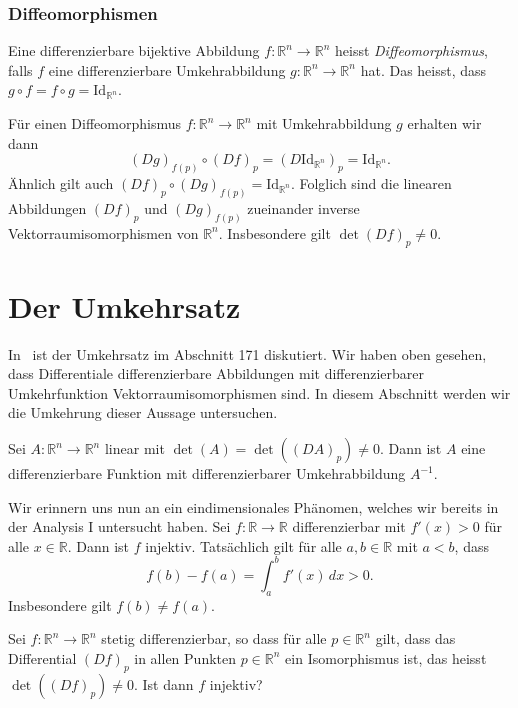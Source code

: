 \documentclass[../main.tex]{subfiles}
\begin{document}
\subsubsection*{Diffeomorphismen}
\begin{definition}
  Eine differenzierbare bijektive Abbildung
  $f \colon \mathbb{R}^n \to \mathbb{R}^n$ 
  heisst \emph{Diffeomorphismus}, falls $f$ 
  eine differenzierbare Umkehrabbildung $g \colon \mathbb{R}^n \to \mathbb{R}^n$ 
  hat.
  Das heisst, dass $g \circ f = f \circ g = \text{Id}_{\mathbb{R}^n}$.
\end{definition}

Für einen Diffeomorphismus $f \colon \mathbb{R}^n \to \mathbb{R}^n$ 
mit Umkehrabbildung $g$ erhalten wir dann
\[
  {(Dg)}_{f(p)} \circ {(Df)}_p 
  = {(D \text{Id}_{\mathbb{R}^n})}_p = \text{Id}_{\mathbb{R}^n}.
\]
Ähnlich gilt auch ${(Df)}_p \circ {(Dg)}_{f(p)} = \text{Id}_{\mathbb{R}^n}$. 
Folglich sind die linearen Abbildungen
${(Df)}_p$ und ${(Dg)}_{f(p)}$ zueinander
inverse Vektorraumisomorphismen von $\mathbb{R}^n$.
Insbesondere gilt
$\det {(Df)}_p \neq 0$.

\section{Der Umkehrsatz}
In~\cite{heuser} ist der Umkehrsatz im Abschnitt 171 diskutiert.
Wir haben oben gesehen, dass Differentiale differenzierbare Abbildungen
mit differenzierbarer Umkehrfunktion Vektorraumisomorphismen sind.
In diesem Abschnitt werden wir die Umkehrung dieser Aussage
untersuchen.

\begin{example}
  Sei $A \colon \mathbb{R}^n \to \mathbb{R}^n$ linear
  mit $\det(A) = \det({(DA)}_p) \ne 0$.
  Dann ist $A$ eine differenzierbare Funktion
  mit differenzierbarer Umkehrabbildung $A^{-1}$.
\end{example}

Wir erinnern uns nun an ein eindimensionales Phänomen,
welches wir bereits in der Analysis I untersucht haben.
Sei $f \colon \mathbb{R} \to \mathbb{R}$ 
differenzierbar mit $f'(x) > 0$ für alle $x \in \mathbb{R}$.
Dann ist $f$ injektiv.
Tatsächlich gilt für alle $a, b \in \mathbb{R}$ mit $a < b$,
dass
\[
  f(b) - f(a) = \int_{a}^{b} f'(x) \, dx > 0.
\]
Insbesondere gilt $f(b) \neq f(a)$.

\begin{question}
  Sei $f \colon \mathbb{R}^n \to \mathbb{R}^n$ stetig
  differenzierbar, so dass für alle
  $p \in \mathbb{R}^n$ gilt, dass
  das Differential ${(Df)}_p$ in allen Punkten
  $p \in \mathbb{R}^n$ ein Isomorphismus ist, das heisst
  $\det({(Df)}_p) \neq 0$.
  Ist dann $f$ injektiv?
\end{question}
\end{document}
